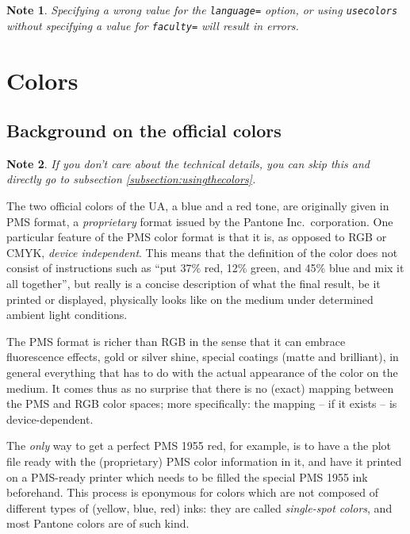 \documentclass[a4paper,10pt]{article}
\newtheorem{note}{Note}
\begin{document}
\begin{note}
  Specifying a wrong value for the \lstinline|language=| option, or using \lstinline|usecolors| without specifying a value for \lstinline|faculty=| will result in errors.
\end{note}


\section{Colors}

\subsection{Background on the official colors}

\begin{note}
If you don't care about the technical details, you can skip this and directly go to subsection \ref{subsection:usingthecolors}.
\end{note}

The two official colors of the UA, a blue and a red tone, are originally given in PMS format, a \emph{proprietary} format issued by the Pantone Inc.\ corporation. One particular feature of the PMS color format is that it is, as opposed to RGB or CMYK, \emph{device independent}. This means that the definition of the color does not consist of instructions such as \enquote{put 37\% red, 12\% green, and 45\% blue and mix it all together}, but really is a concise description of what the final result, be it printed or displayed, physically looks like on the medium under determined ambient light conditions.

The PMS format is richer than RGB in the sense that it can embrace fluorescence effects, gold or silver shine, special coatings (matte and brilliant), in general everything that has to do with the actual appearance of the color on the medium. It comes thus as no surprise that there is no (exact) mapping between the PMS and RGB color spaces; more specifically: the mapping -- if it exists -- is device-dependent.

The \emph{only} way to get a perfect PMS 1955 red, for example, is to have a the plot file ready with the (proprietary) PMS color information in it, and have it printed on a PMS-ready printer which needs to be filled the special PMS 1955 ink beforehand. This process is eponymous for colors which are not composed of different types of (yellow, blue, red) inks: they are called \emph{single-spot colors}, and most Pantone\textsuperscript{\textregistered} colors are of such kind.
\end{document}
